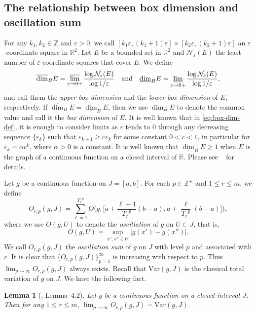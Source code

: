 \documentclass[11pt]{amsart}
\newtheorem{lem}[thm]{Lemma}
\theoremstyle{definition}
\theoremstyle{remark}
\numberwithin{equation}{section}
\newcommand{\Var}{\mathrm{Var}}
\def\vep{\varepsilon}
\def\updimB{\overline{\dim}_B}
\def\lowdimB{\underline{\dim}_B}
\begin{document}
\subsection{The relationship between box dimension and oscillation sum}
For any $k_1, k_2\in\mathbb{Z}$ and $\varepsilon>0$, we call $[k_1\varepsilon,(k_1+1)\varepsilon] \times [k_2\varepsilon,(k_2+1)\varepsilon]$ an $\varepsilon$-coordinate square in $\mathbb{R}^2$. Let $E$ be a bounded set in $\mathbb{R}^2$ and $\mathcal{N}_{\vep}(E) $ the least number of $\varepsilon$-coordinate squares that cover $E$.
We define
\begin{equation}\label{eq:box-dim-def}
	   \updimB E=\varlimsup_{\varepsilon\to 0+}\frac{\log \mathcal{N}_{\varepsilon}(E)}{\log1/\varepsilon}
	\quad\text{and}	\quad
	\lowdimB E=\varliminf_{\varepsilon\to 0+}\frac{\log \mathcal{N}_{\varepsilon}(E)}{\log1/\varepsilon},
\end{equation}
and call them the \emph{upper box dimension} and the \emph{lower box dimension} of $E$, respectively. If $\updimB E=\lowdimB E$, then we use $\dim_B E$ to denote the common value and call it the \emph{box dimension} of $E$.
It is well known that in \eqref{eq:box-dim-def}, it is enough to consider limits as $\varepsilon$ tends to $0$ through any decreasing sequence $\{\varepsilon_k\}$ such that $\varepsilon_{k+1}\geq c\varepsilon_k$ for some constant $0<c<1$, in particular for $\varepsilon_k=\alpha c^k$, where $\alpha>0$ is a constant.
It is well known that $\lowdimB  E\geq 1$ when $E$ is the graph of a continuous function on a closed interval of $\mathbb{R}$. Please see ~\cite{Fal14} for details.

Let $g$ be a continuous function on $J=[a,b]$. For each $p\in \mathbb{Z}^+$ and $1\leq r\leq m$,
we define
\[
O_{r,p}(g, J)
=\sum\limits_{\ell=1}^{{T_r}^p} O\Big(g,\Big[a+\frac{\ell-1}{{T_r}^p}(b-a) , a+\frac{\ell}{{T_r}^p}(b-a) \Big]\Big),
\]
where we use $O(g,U)$ to denote the \emph{oscillation} of $g$ on $U\subset J$, that is,
\begin{equation*}
	O(g,U)= \sup\limits_{x',x'' \in U}|g({x}')-g({x}'')|.
\end{equation*}
We call $O_{r,p}(g, J)$ the \emph{oscillation sum} of $g$ on $J$ with level $p$ and associated with $r$.
It is clear that $\{O_{r,p}(g,J)\}_{p=1}^\infty$ is increasing with respect to $p$. Thus $\lim_{p\to \infty} O_{r,p}(g,J)$ always exists.
Recall that $\Var(g,J)$ is the classical total variation of $g$ on $J$. We have the following fact.
\begin{lem}[\cite{JR24}, Lemma~4.2]\label{lem:VarOinfty}
	Let $g$ be a continuous function on a closed interval $J$. Then for any $1\leq r\leq m$, $\lim_{p\to \infty} O_{r,p}(g,J)=\Var(g,J)$.
\end{lem}
\end{document}
